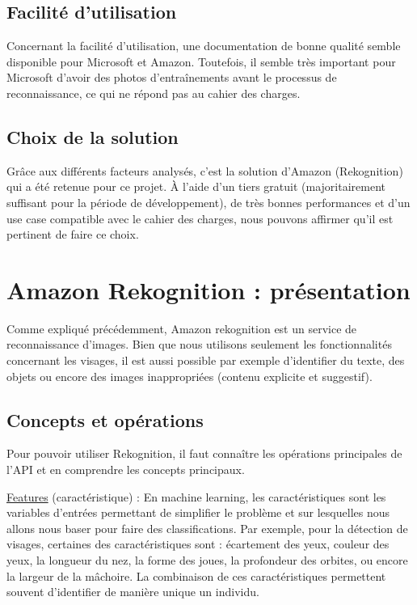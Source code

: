 \subsection{Facilité d’utilisation}
Concernant la facilité d’utilisation, une documentation de bonne qualité semble disponible pour Microsoft et
Amazon. Toutefois, il semble très important pour Microsoft d’avoir des photos d’entraînements avant le processus
de reconnaissance, ce qui ne répond pas au cahier des charges.

\subsection{Choix de la solution}
Grâce aux différents facteurs analysés, c’est la solution d’Amazon (Rekognition) qui a été retenue pour ce projet. À
l’aide d’un tiers gratuit (majoritairement suffisant pour la période de développement), de très bonnes performances
et d’un use case compatible avec le cahier des charges, nous pouvons affirmer qu’il est pertinent de faire ce choix.

\section{Amazon Rekognition : présentation}
Comme expliqué précédemment, Amazon rekognition est un service de reconnaissance d’images. Bien que nous
utilisons seulement les fonctionnalités concernant les visages, il est aussi possible par exemple d’identifier du texte,
des objets ou encore des images inappropriées (contenu explicite et suggestif).

\subsection{Concepts et opérations}
Pour pouvoir utiliser Rekognition, il faut connaître les opérations principales de l’API et en comprendre les concepts
principaux.

\underline{Features} (caractéristique) : En machine learning, les caractéristiques sont les variables d’entrées permettant de
simplifier le problème et sur lesquelles nous allons nous baser pour faire des classifications. Par exemple, pour la
détection de visages, certaines des caractéristiques sont : écartement des yeux, couleur des yeux, la longueur du
nez, la forme des joues, la profondeur des orbites, ou encore la largeur de la mâchoire. La combinaison de ces
caractéristiques permettent souvent d’identifier de manière unique un individu.

